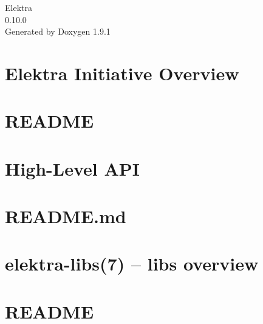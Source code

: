 \let\mypdfximage\pdfximage\def\pdfximage{\immediate\mypdfximage}\documentclass[twoside]{book}
\newcommand{\+}{\discretionary{\mbox{\scriptsize$\hookleftarrow$}}{}{}}
\newcommand{\clearemptydoublepage}{%
  \newpage{\pagestyle{empty}\cleardoublepage}%
}
\begin{document}
\raggedbottom

\hypersetup{pageanchor=false,
             bookmarksnumbered=true,
             pdfencoding=unicode
            }
\begin{titlepage}
\vspace*{7cm}
\begin{center}%
{\Large Elektra \\[1ex]\large 0.\+10.\+0 }\\
\vspace*{1cm}
{\large Generated by Doxygen 1.9.1}\\
\end{center}
\end{titlepage}
\clearemptydoublepage
{}
\tableofcontents
\clearemptydoublepage
{}
\hypersetup{pageanchor=true}

\chapter{Elektra Initiative Overview}
\label{index}\hypertarget{index}{}
\chapter{README}
\label{md_src_libs_elektra_README}

\chapter{High-\/\+Level API}
\label{src_libs_highlevel_README_md}

\chapter{README.\+md}
\label{src_libs_merge_README_md}

\chapter{elektra-\/libs(7) -- libs overview}
\label{src_libs_README_md}

\chapter{README}
\label{md_src_libs_template_README}

\end{document}
